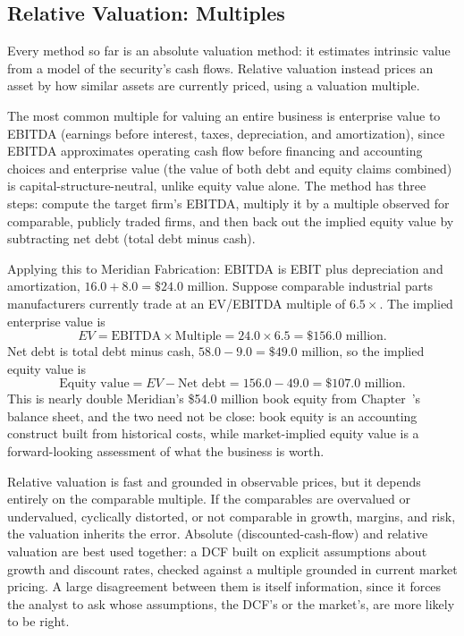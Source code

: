 \documentclass[../ai_in_finance]{subfiles}
\begin{document}
\subsection{Relative Valuation: Multiples}
\label{sec:valuation-multiples}

Every method so far is an absolute valuation method: it estimates intrinsic value from a model of the security's cash flows. Relative valuation instead prices an asset by how similar assets are currently priced, using a valuation multiple.

The most common multiple for valuing an entire business is enterprise value to EBITDA (earnings before interest, taxes, depreciation, and amortization), since EBITDA approximates operating cash flow before financing and accounting choices and enterprise value (the value of both debt and equity claims combined) is capital-structure-neutral, unlike equity value alone. The method has three steps: compute the target firm's EBITDA, multiply it by a multiple observed for comparable, publicly traded firms, and then back out the implied equity value by subtracting net debt (total debt minus cash).

Applying this to Meridian Fabrication: EBITDA is EBIT plus depreciation and amortization, $16.0 + 8.0 = \$24.0$ million. Suppose comparable industrial parts manufacturers currently trade at an EV/EBITDA multiple of $6.5\times$. The implied enterprise value is
\begin{equation*}
EV = \text{EBITDA} \times \text{Multiple} = 24.0 \times 6.5 = \$156.0 \text{ million}.
\end{equation*}
Net debt is total debt minus cash, $58.0 - 9.0 = \$49.0$ million, so the implied equity value is
\begin{equation*}
\text{Equity value} = EV - \text{Net debt} = 156.0 - 49.0 = \$107.0 \text{ million}.
\end{equation*}
This is nearly double Meridian's \$54.0 million book equity from Chapter~'s balance sheet, and the two need not be close: book equity is an accounting construct built from historical costs, while market-implied equity value is a forward-looking assessment of what the business is worth.

Relative valuation is fast and grounded in observable prices, but it depends entirely on the comparable multiple. If the comparables are overvalued or undervalued, cyclically distorted, or not comparable in growth, margins, and risk, the valuation inherits the error. Absolute (discounted-cash-flow) and relative valuation are best used together: a DCF built on explicit assumptions about growth and discount rates, checked against a multiple grounded in current market pricing. A large disagreement between them is itself information, since it forces the analyst to ask whose assumptions, the DCF's or the market's, are more likely to be right.
\end{document}
